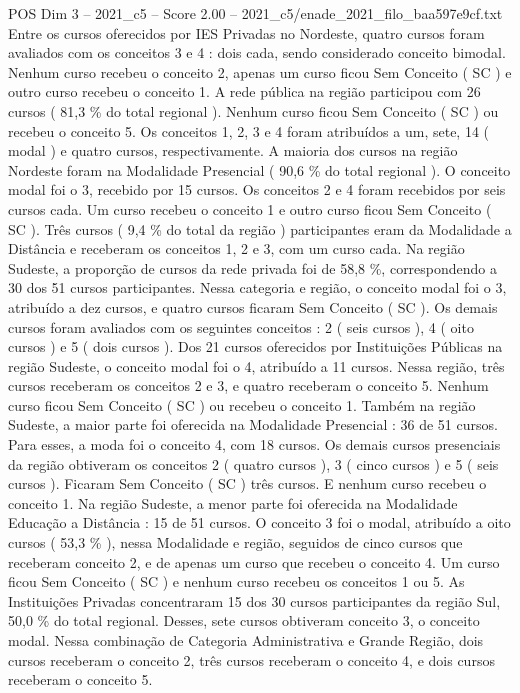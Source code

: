 \begin{textsample}{POS Dim 3 – 2021\_c5 – Score 2.00 – 2021\_c5/enade\_2021\_filo\_baa597e9cf.txt}
Entre os cursos oferecidos por IES Privadas no Nordeste, quatro cursos foram avaliados com os conceitos 3 e 4 : dois cada, sendo considerado conceito bimodal.
Nenhum curso recebeu o conceito 2, apenas um curso ficou Sem Conceito ( SC ) e outro curso recebeu o conceito 1.
A rede pública na região participou com 26 cursos ( 81,3 \% do total regional ).
Nenhum curso ficou Sem Conceito ( SC ) ou recebeu o conceito 5.
Os conceitos 1, 2, 3 e 4 foram atribuídos a um, sete, 14 ( modal ) e quatro cursos, respectivamente.
A maioria dos cursos na região Nordeste foram na Modalidade Presencial ( 90,6 \% do total regional ).
O conceito modal foi o 3, recebido por 15 cursos.
Os conceitos 2 e 4 foram recebidos por seis cursos cada.
Um curso recebeu o conceito 1 e outro curso ficou Sem Conceito ( SC ).
Três cursos ( 9,4 \% do total da região ) participantes eram da Modalidade a Distância e receberam os conceitos 1, 2 e 3, com um curso cada.
Na região Sudeste, a proporção de cursos da rede privada foi de 58,8 \%, correspondendo a 30 dos 51 cursos participantes.
Nessa categoria e região, o conceito modal foi o 3, atribuído a dez cursos, e quatro cursos ficaram Sem Conceito ( SC ).
Os demais cursos foram avaliados com os seguintes conceitos : 2 ( seis cursos ), 4 ( oito cursos ) e 5 ( dois cursos ).
Dos 21 cursos oferecidos por Instituições Públicas na região Sudeste, o conceito modal foi o 4, atribuído a 11 cursos.
Nessa região, três cursos receberam os conceitos 2 e 3, e quatro receberam o conceito 5.
Nenhum curso ficou Sem Conceito ( SC ) ou recebeu o conceito 1.
Também na região Sudeste, a maior parte foi oferecida na Modalidade Presencial : 36 de 51 cursos.
Para esses, a moda foi o conceito 4, com 18 cursos.
Os demais cursos presenciais da região obtiveram os conceitos 2 ( quatro cursos ), 3 ( cinco cursos ) e 5 ( seis cursos ).
Ficaram Sem Conceito ( SC ) três cursos.
E nenhum curso recebeu o conceito 1.
Na região Sudeste, a menor parte foi oferecida na Modalidade Educação a Distância : 15 de 51 cursos.
O conceito 3 foi o modal, atribuído a oito cursos ( 53,3 \% ), nessa Modalidade e região, seguidos de cinco cursos que receberam conceito 2, e de apenas um curso que recebeu o conceito 4.
Um curso ficou Sem Conceito ( SC ) e nenhum curso recebeu os conceitos 1 ou 5.
As Instituições Privadas concentraram 15 dos 30 cursos participantes da região Sul, 50,0 \% do total regional.
Desses, sete cursos obtiveram conceito 3, o conceito modal.
Nessa combinação de Categoria Administrativa e Grande Região, dois cursos receberam o conceito 2, três cursos receberam o conceito 4, e dois cursos receberam o conceito 5.

\end{textsample}
